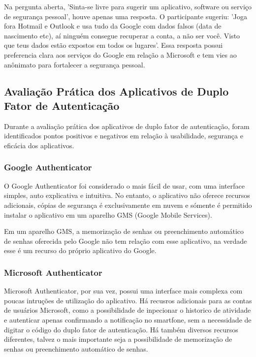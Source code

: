 \documentclass[12pt]{article}
\begin{document}
Na pergunta aberta, 'Sinta-se livre para sugerir um aplicativo, software ou
serviço de segurança pessoal', houve apenas uma resposta.
O participante sugeriu: 'Joga fora Hotmail e Outlook e usa tudo da Google com
dados falsos (data de nascimento etc), aí ninguém consegue recuperar a conta,
a não ser você.
Visto que teus dados estão expostos em todos os lugares'.
Essa resposta possui preferencia clara aos serviços do Google em relação a
Microsoft e tem vies ao anônimato para fortalecer a segurança pessoal.

\subsection{Avaliação Prática dos Aplicativos de Duplo Fator de Autenticação}

Durante a avaliação prática dos aplicativos de duplo fator de autenticação,
foram identificados pontos positivos e negativos em relação à usabilidade,
segurança e eficácia dos aplicativos.

\subsubsection{Google Authenticator}

O Google Authenticator foi considerado o mais fácil de usar, com uma
interface simples, auto explicativa e intuitiva.
No entanto, o aplicativo não oferece recursos adicionais, cópias de segurança
é exclusivamente em nuvem e sómente é permitido instalar o aplicativo em um
aparelho GMS (Google Mobile Services).

Em um aparelho GMS, a memorização de senhas ou preenchimento automático de
senhas oferecida pelo Google não tem relação com esse aplicativo, na verdade
esse é um recurso do próprio aplicativo do Google.

\subsubsection{Microsoft Authenticator}\label{sec:figs}

Microsoft Authenticator, por sua vez, possui uma interface mais complexa com
poucas intruções de utilização do aplicativo.
Há recusros adicionais para as contas de usuários Microsoft, como a possibilidade de
inpecionar o historico de atividade e autenticar apenas confirmando a notificação
no smartfone, sem a necessidade de digitar o código do duplo fator de autenticação.
Há também diversos recursos diferentes, talvez o mais importante seja a possibilidade
de memorização de senhas ou preenchimento automático de senhas.
\end{document}
